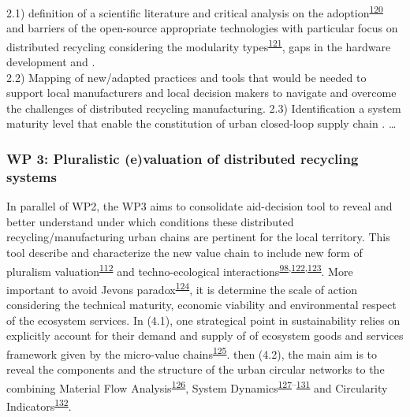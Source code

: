 \documentclass[
  11pt,
  a4paperpaper,
  onecolumn]{article}
\begin{document}
2.1) definition of a scientific literature and critical analysis on the
adoption\textsuperscript{\protect\hyperlink{ref-reinauer2021}{120}} and
barriers of the open-source appropriate technologies with particular
focus on distributed recycling considering the modularity
types\textsuperscript{\protect\hyperlink{ref-gavras2021}{121}}, gaps in
the hardware development and .\\
2.2) Mapping of new/adapted practices and tools that would be needed to
support local manufacturers and local decision makers to navigate and
overcome the challenges of distributed recycling manufacturing. 2.3)
Identification a system maturity level that enable the constitution of
urban closed-loop supply chain . \ldots{}

\hypertarget{wp-3-pluralistic-evaluation-of-distributed-recycling-systems}{%
\subsubsection{WP 3: Pluralistic (e)valuation of distributed recycling
systems}\label{wp-3-pluralistic-evaluation-of-distributed-recycling-systems}}

In parallel of WP2, the WP3 aims to consolidate aid-decision tool to
reveal and better understand under which conditions these distributed
recycling/manufacturing urban chains are pertinent for the local
territory. This tool describe and characterize the new value chain to
include new form of pluralism
valuation\textsuperscript{\protect\hyperlink{ref-gunton2022}{112}} and
techno-ecological
interactions\textsuperscript{\protect\hyperlink{ref-Saladini2018}{98},\protect\hyperlink{ref-Liu2020c}{122},\protect\hyperlink{ref-Liu2019g}{123}}.
More important to avoid Jevons
paradox\textsuperscript{\protect\hyperlink{ref-giampietro2018}{124}}, it
is determine the scale of action considering the technical maturity,
economic viability and environmental respect of the ecosystem services.
In (4.1), one strategical point in sustainability relies on explicitly
account for their demand and supply of of ecosystem goods and services
framework given by the micro-value
chains\textsuperscript{\protect\hyperlink{ref-Diwekar2021}{125}}. then
(4.2), the main aim is to reveal the components and the structure of the
urban circular networks to the combining Material Flow
Analysis\textsuperscript{\protect\hyperlink{ref-saidani2021}{126}},
System
Dynamics\textsuperscript{\protect\hyperlink{ref-kuo2021}{127}--\protect\hyperlink{ref-perez-perez2021}{131}}
and Circularity
Indicators\textsuperscript{\protect\hyperlink{ref-saidani2019}{132}}.
\end{document}
